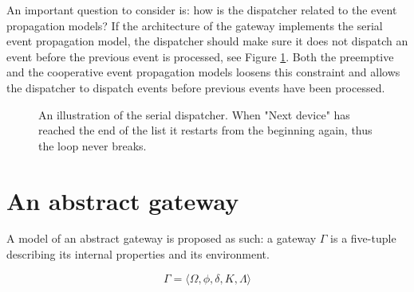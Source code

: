 An important question to consider is: how is the dispatcher related to the
event propagation models? If the architecture of the gateway implements the
serial event propagation model, the dispatcher should make sure it does not
dispatch an event before the previous event is processed, see Figure
\ref{fig:dispatcher-serial}. Both the preemptive and the cooperative event
propagation models loosens this constraint and allows the dispatcher to
dispatch events before previous events have been processed.

\begin{figure}[h!]
    \centering
    \caption{An illustration of the serial dispatcher. When "Next device" has
    reached the end of the list it restarts from the beginning again, thus the
    loop never breaks.}
    \label{fig:dispatcher-serial}
\end{figure}

\section{An abstract gateway}

A model of an abstract gateway is proposed as such: a gateway $\Gamma$ is a
five-tuple describing its internal properties and its environment.

\begin{equation}
\Gamma = \big \langle \Omega, \phi, \delta, K, \Lambda \big \rangle
\end{equation}

